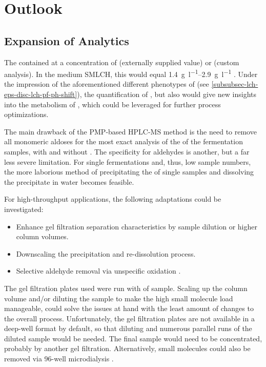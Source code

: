 \section{Outlook\label{sec-lch-eps-outlook}}
\subsection{Expansion of Analytics}
The \lch{} contained \acet{} at a concentration of  (externally supplied value) or  (custom analysis). In the medium SMLCH, this would equal \SIrange{1.4}{2.9}{\gram\per\litre} \acet{}. Under the impression of the aforementioned different phenotypes of \strain{} (see \vref{subsubsec-lch-eps-disc-lch-pf-ph-shift}), the quantification of \acet{}, but also \fora{} would give new insights into the metabolism of \strain{}, which could be leveraged for further process optimizations.

The main drawback of the PMP-based HPLC-MS method is the need to remove all monomeric aldoses for the most exact analysis of the \amc{} of the fermentation samples, with and without \lch{}. The specificity for aldehydes is another, but a far less severe limitation. For single fermentations and, thus, low sample numbers, the more laborious method of precipitating the \eps{} of single samples and dissolving the precipitate in water becomes feasible.

For high-throughput applications, the following adaptations could be investigated:
\begin{itemize}
	\item Enhance gel filtration separation characteristics by sample dilution or higher column volumes.
	\item Downscaling the precipitation and re-dissolution process.
	\item Selective aldehyde removal via unspecific oxidation \cite{Hult2007, Odebunmi2008}.
\end{itemize}

The gel filtration plates used were run with  of sample. Scaling up the column volume and/or diluting the sample to make the high small molecule load manageable, could solve the issues at hand with the least amount of changes to the overall process. Unfortunately, the gel filtration plates are not available in a deep-well format by default, so that diluting and numerous parallel runs of the diluted sample would be needed. The final sample would need to be concentrated, probably by another gel filtration. Alternatively, small molecules could also be removed via 96-well microdialysis \cite{Banker2003}.

